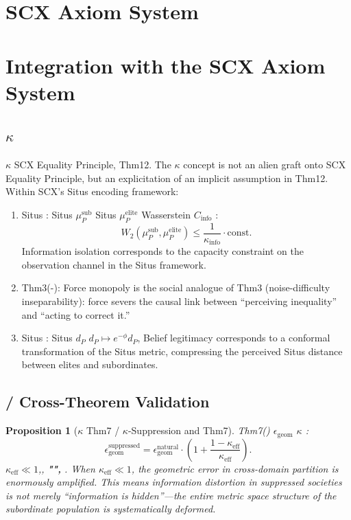 \documentclass[11pt,a4paper]{article}
\newtheorem{proposition}[theorem]{Proposition}
\theoremstyle{definition}
\newcommand{\eqtheory}{Equality Principle}
\newcommand{\coupling}{\kappa}
\newcommand{\paren}[1]{\left(#1\right)}
\begin{document}
\section{ SCX Axiom System}
\section{Integration with the SCX Axiom System}
\subsection{$\coupling$}
$\coupling$ SCX Equality Principle, Thm12.
The $\coupling$ concept is not an alien graft onto SCX \eqtheory, but an
explicitation of an implicit assumption in Thm12. Within SCX's Situs encoding framework:
\begin{enumerate}
 \item  Situs : 
 Situs $\mu_P^{\text{sub}}$ Situs $\mu_P^{\text{elite}}$
 Wasserstein $C_{\text{info}}$ : 
 \[
 W_2(\mu_P^{\text{sub}}, \mu_P^{\text{elite}}) \leq
 \frac{1}{\coupling_{\text{info}}} \cdot \text{const}.
 \]
 Information isolation corresponds to the capacity constraint on the observation
 channel in the Situs framework.
 \item  Thm3(-): 
 Force monopoly is the social analogue of Thm3 (noise-difficulty inseparability):
 force severs the causal link between ``perceiving inequality'' and ``acting to correct it.''
 \item  Situs : 
 Situs $d_P$ $d_P \mapsto e^{-\phi} d_P$, 
 Belief legitimacy corresponds to a conformal transformation of the Situs metric,
 compressing the perceived Situs distance between elites and subordinates.
\end{enumerate}
\subsection{ / Cross-Theorem Validation}
\begin{proposition}[$\coupling$ Thm7 / $\coupling$-Suppression and Thm7]
\label{prop:thm7}
Thm7() $\epsilon_{\text{geom}}$ $\coupling$ : 
\[
\epsilon_{\text{geom}}^{\text{suppressed}} = \epsilon_{\text{geom}}^{\text{natural}} \cdot
 \paren{1 + \frac{1 - \coupling_{\text{eff}}}{\coupling_{\text{eff}}}}.
\]
 $\coupling_{\text{eff}} \ll 1$,, 
\textbf{"", }.
When $\coupling_{\text{eff}} \ll 1$, the geometric error in cross-domain partition is
enormously amplified. This means information distortion in suppressed societies is not
merely ``information is hidden''---the entire metric space structure of the subordinate
population is systematically deformed.
\end{proposition}
\end{document}
